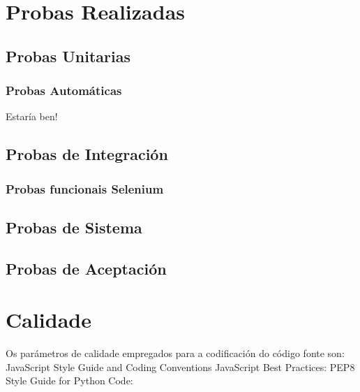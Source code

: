 \chapter{Probas Realizadas}

\section{Probas Unitarias}
  \subsection{Probas Automáticas}
  Estaría ben!

\section{Probas de Integración}
  \subsection{Probas funcionais Selenium}


\section{Probas de Sistema}

\section{Probas de Aceptación}

\chapter{Calidade}
	Os parámetros de calidade empregados para a codificación do código fonte son:
		JavaScript Style Guide and Coding Conventions\cite{javascript-style-guide}
		JavaScript Best Practices:\cite{javascript-best-practices}
		PEP8 Style Guide for Python Code: \cite{pepe8-style-guide}